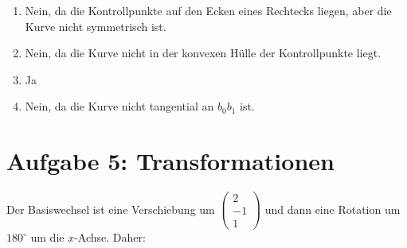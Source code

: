 \documentclass[a4paper]{scrartcl}
\begin{document}
\begin{enumerate}
    \item Nein, da die Kontrollpunkte auf den Ecken eines Rechtecks liegen,
          aber die Kurve nicht symmetrisch ist.
    \item Nein, da die Kurve nicht in der konvexen Hülle der Kontrollpunkte
          liegt.
    \item Ja
    \item Nein, da die Kurve nicht tangential an $b_0 b_1$ ist.
\end{enumerate}

\section*{Aufgabe 5: Transformationen}



Der Basiswechsel ist eine Verschiebung um $\begin{pmatrix}2\\-1\\1\end{pmatrix}$
und dann eine Rotation um $180^\circ$ um die $x$-Achse. Daher:
\end{document}
